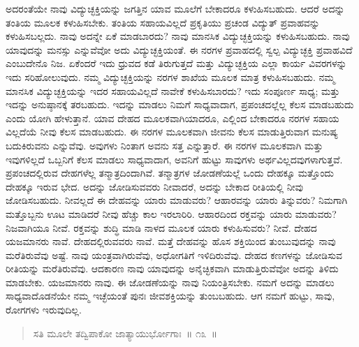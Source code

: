 ಅದರಂತೆಯೇ ನಾವು ವಿದ್ಯುಚ್ಛಕ್ತಿಯನ್ನು ಜಗತ್ತಿನ ಯಾವ ಮೂಲೆಗೆ ಬೇಕಾದರೂ ಕಳುಹಿಸಬಹುದು. ಆದರೆ ಅದನ್ನು ತಂತಿಯ ಮೂಲಕ ಕಳುಹಿಸಬೇಕು. ತಂತಿಯ ಸಹಾಯವಿಲ್ಲದೆ ಪ್ರಕೃತಿಯು ಪ್ರಚಂಡ ವಿದ್ಯುತ್​ ಪ್ರವಾಹವನ್ನು ಕಳುಹಿಸಬಲ್ಲದು. ನಾವು ಅದನ್ನೇ ಏಕೆ ಮಾಡಬಾರದು? ನಾವು ಮಾನಸಿಕ ವಿದ್ಯುಚ್ಛಕ್ತಿಯನ್ನು ಕಳುಹಿಸಬಹುದು. ನಾವು ಯಾವುದನ್ನು ಮನಸ್ಸು ಎನ್ನುವೆವೋ ಅದು ವಿದ್ಯುಚ್ಛಕ್ತಿಯಂತೆ. ಈ ನರಗಳ ಪ್ರವಾಹದಲ್ಲಿ ಸ್ವಲ್ಪ ವಿದ್ಯುಚ್ಛಕ್ತಿ ಪ್ರವಾಹವಿದೆ ಎಂಬುದೇನೊ ನಿಜ. ಏಕೆಂದರೆ ಇದು ಧ್ರುವದ ಕಡೆ ತಿರುಗುತ್ತದೆ ಮತ್ತು ವಿದ್ಯುಚ್ಛಕ್ತಿಯ ಎಲ್ಲಾ ಕಾರ್ಯ ವಿವರಗಳನ್ನು ಇದು ಸರಿಹೋಲುವುದು. ನಮ್ಮ ವಿದ್ಯುಚ್ಛಕ್ತಿಯನ್ನು ನರಗಳ ಶಾಖೆಯ ಮೂಲಕ ಮಾತ್ರ ಕಳುಹಿಸಬಹುದು. ನಮ್ಮ ಮಾನಸಿಕ ವಿದ್ಯುಚ್ಛಕ್ತಿಯನ್ನು ಇದರ ಸಹಾಯವಿಲ್ಲದೆ ನಾವೇಕೆ ಕಳುಹಿಸಬಾರದು? ಇದು ಸಂಪೂರ್ಣ ಸಾಧ್ಯ; ಮತ್ತು ಇದನ್ನು ಅನುಷ್ಠಾನಕ್ಕೆ ತರಬಹುದು. ಇದನ್ನು ಮಾಡಲು ನಿಮಗೆ ಸಾಧ್ಯವಾದಾಗ, ಪ್ರಪಂಚದಲ್ಲೆಲ್ಲ ಕೆಲಸ ಮಾಡಬಹುದು ಎಂದು ಯೋಗಿ ಹೇಳುತ್ತಾನೆ. ಯಾವ ದೇಹದ ಮೂಲಕವಾಗಿಯಾದರೂ, ಎಲ್ಲಿಂದ ಬೇಕಾದರೂ ನರಗಳ ಸಹಾಯ ವಿಲ್ಲದೆಯೆ ನೀವು ಕೆಲಸ ಮಾಡಬಹುದು. ಈ ನರಗಳ ಮೂಲಕವಾಗಿ ಜೀವನು ಕೆಲಸ ಮಾಡುತ್ತಿರುವಾಗ ಮನುಷ್ಯ ಬದುಕಿರುವನು ಎನ್ನುವೆವು. ಅವುಗಳು ನಿಂತಾಗ ಅವನು ಸತ್ತ ಎನ್ನುತ್ತಾರೆ. ಈ ನರಗಳ ಮೂಲಕವಾಗಿ ಮತ್ತು ಇವುಗಳಿಲ್ಲದೆ ಒಬ್ಬನಿಗೆ ಕೆಲಸ ಮಾಡಲು ಸಾಧ್ಯವಾದಾಗ, ಅವನಿಗೆ ಹುಟ್ಟು ಸಾವುಗಳು ಅರ್ಥವಿಲ್ಲದವುಗಳಾಗುತ್ತವೆ. ಪ್ರಪಂಚದಲ್ಲಿರುವ ದೇಹಗಳೆಲ್ಲ ತನ್ಮಾತ್ರದಿಂದಾಗಿವೆ. ತನ್ಮಾತ್ರಗಳ ಜೋಡಣೆಯಲ್ಲೆ ಒಂದು ದೇಹಕ್ಕೂ ಮತ್ತೊಂದು ದೇಹಕ್ಕೂ ಇರುವ ಭೇದ. ಅದನ್ನು ಜೋಡಿಸುವವರು ನೀವಾದರೆ, ಅದನ್ನು ಬೇಕಾದ ರೀತಿಯಲ್ಲಿ ನೀವು ಜೋಡಿಸಬಹುದು. ನೀವಲ್ಲದೆ ಈ ದೇಹವನ್ನು ಯಾರು ಮಾಡುವರು? ಆಹಾರವನ್ನು ಯಾರು ತಿನ್ನುವರು? ನಿಮಗಾಗಿ ಮತ್ತೊಬ್ಬನು ಊಟ ಮಾಡಿದರೆ ನೀವು ಹೆಚ್ಚು ಕಾಲ ಇರಲಾರಿರಿ. ಆಹಾರದಿಂದ ರಕ್ತವನ್ನು ಯಾರು ಮಾಡುವರು? ನಿಜವಾಗಿಯೂ ನೀವೆ. ರಕ್ತವನ್ನು ಶುದ್ಧಿ ಮಾಡಿ ನಾಳದ ಮೂಲಕ ಯಾರು ಕಳುಹಿಸುವರು? ನೀವೆ. ದೇಹದ ಯಜಮಾನರು ನಾವೆ. ದೇಹದಲ್ಲಿರುವವರು ನಾವೆ. ಮತ್ತೆ ದೇಹವನ್ನು ಹೊಸ ಶಕ್ತಿಯಿಂದ ತುಂಬುವುದನ್ನು ನಾವು ಮರೆತಿರುವೆವು ಅಷ್ಟೆ. ನಾವು ಯಂತ್ರವಾಗಿರುವೆವು, ಅಧೋಗತಿಗೆ ಇಳಿದಿರುವೆವು. ದೇಹದ ಕಣಗಳನ್ನು ಜೋಡಿಸುವ ರೀತಿಯನ್ನು ಮರೆತಿರುವೆವು. ಆದಕಾರಣ ನಾವು ಯಾವುದನ್ನು ಅನೈಚ್ಛಿಕವಾಗಿ ಮಾಡುತ್ತಿರುವೆವೋ ಅದನ್ನು ತಿಳಿದು ಮಾಡಬೇಕು. ಯಜಮಾನರು ನಾವು. ಈ ಜೋಡಣೆಯನ್ನು ನಾವು ನಿಯಂತ್ರಿಸಬೇಕು. ನಮಗೆ ಅದನ್ನು ಮಾಡಲು ಸಾಧ್ಯವಾದೊಡನೆಯೇ ನಮ್ಮ ಇಚ್ಛೆಯಂತೆ ಪುನಃ ಜೀವಶಕ್ತಿಯನ್ನು ತುಂಬಬಹುದು. ಆಗ ನಮಗೆ ಹುಟ್ಟು, ಸಾವು, ರೋಗಗಳು ಇರುವುದಿಲ್ಲ. 


\begin{verse}
ಸತಿ ಮೂಲೇ ತದ್ವಿಪಾಕೋ ಜಾತ್ಯಾಯುರ್ಭೋಗಾಃ~॥ ೧೩~॥
\end{verse}



\vskip 0.2cm 

